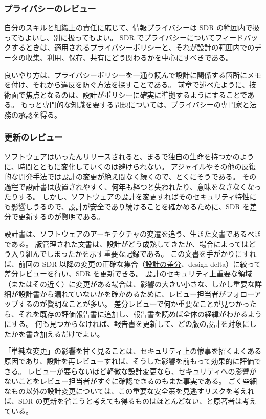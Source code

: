 \documentclass[uplatex]{jsarticle}
\begin{document}
\subsubsection{プライバシーのレビュー}

自分のスキルと組織上の責任に応じて、情報プライバシーは SDR の範囲内で扱ってもよいし、別に扱ってもよい。
SDR でプライバシーについてフィードバックするときは、適用されるプライバシーポリシーと、それが設計の範囲内でのデータの収集、利用、保存、共有にどう関わるかを中心にすべきである。

良いやり方は、プライバシーポリシーを一通り読んで設計に関係する箇所にメモを付け、それから違反を防ぐ方法を探すことである。
前章で述べたように、技術面で焦点となるのは、設計がポリシーに確実に準拠するようにすることである。
もっと専門的な知識を要する問題については、プライバシーの専門家と法務の承認を得る。

\subsubsection{更新のレビュー}

ソフトウェアはいったんリリースされると、まるで独自の生命を持つかのように、時間とともに変化していくのは避けられない。
アジャイルやその他の反復的な開発手法では設計の変更が絶え間なく続くので、とくにそうである。
その過程で設計書は放置されやすく、何年も経つと失われたり、意味をなさなくなったりする。
しかし、ソフトウェアの設計を変更すればそのセキュリティ特性にも影響しうるので、設計が安全であり続けることを確かめるために、SDR を差分で更新するのが賢明である。

設計書は、ソフトウェアのアーキテクチャの変遷を追う、生きた文書であるべきである。
版管理された文書は、設計がどう成熟してきたか、場合によってはどう入り組んでしまったかを示す重要な記録である。
この文書を手がかりにすれば、前回の SDR 以降の変更の正確な集合（\underline{設計の差分}、design delta）に絞って差分レビューを行い、SDR を更新できる。
設計のセキュリティ上重要な領域（またはその近く）に変更がある場合は、影響の大きい小さな、しかし重要な詳細が設計書から漏れていないかを確かめるために、レビュー担当者がフォローアップするのが賢明なことが多い。
差分レビューで何か重要なことが見つかったら、それを既存の評価報告書に追加し、報告書を読めば全体の経緯がわかるようにする。
何も見つからなければ、報告書を更新して、どの版の設計を対象にしたかを書き加えるだけでよい。

「単純な変更」の影響を甘く見ることは、セキュリティ上の惨事を招くよくある原因であり、設計を再レビューすれば、そうした影響を前もって効果的に評価できる。
レビューが要らないほど軽微な設計変更なら、セキュリティへの影響がないことをレビュー担当者がすぐに確認できるのもまた事実である。
ごく些細なもの以外の設計変更については、この重要な安全策を見逃すリスクを考えれば、SDR の更新を省こうと考えても得るものはほとんどない、と原著者は考えている。
\end{document}
